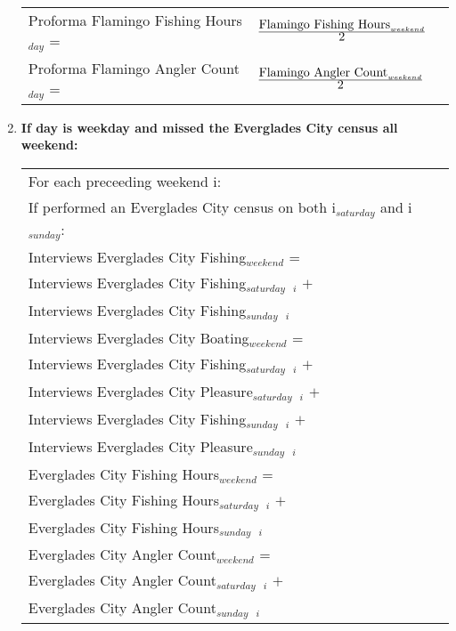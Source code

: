 \documentclass[letterpaper,12pt]{article}
\newcommand{\hspacer}{\hspace*{1cm}}
\newcommand{\fraction}[1]{\textrm{\normalsize{#1}}}
\begin{document}
\begin{enumerate}
\begin{tabular}{l@{ }l@{ }l}
	Proforma Flamingo Fishing Hours$_{day}$ =
		& $
\frac
	{\fraction{Flamingo Fishing Hours}_{weekend}}
	{\fraction{2}}
		$ \\

	Proforma Flamingo Angler Count$_{day}$ =
		& $
\frac
	{\fraction{Flamingo Angler Count}_{weekend}}
	{\fraction{2}}
		$ \\
\end{tabular}

\item
\textbf{If day is weekday and missed the Everglades City census all weekend:} \\
\begin{tabular}{l@{ }l@{ }l}
	For each preceeding weekend i: \\
\hspacer If performed an Everglades City census on both i$_{saturday}$ and i$_{sunday}$: \\
\hspacer \hspacer	Interviews Everglades City Fishing$_{weekend}$ = \\
\hspacer \hspacer \hspacer Interviews Everglades City Fishing$_{saturday}$\ $_{i}$ $+$ \\
\hspacer \hspacer \hspacer Interviews Everglades City Fishing$_{sunday}$\ $_{i}$ \\

\hspacer \hspacer	Interviews Everglades City Boating$_{weekend}$ = \\
\hspacer \hspacer \hspacer Interviews Everglades City Fishing$_{saturday}$\ $_{i}$ $+$ \\
\hspacer \hspacer \hspacer Interviews Everglades City Pleasure$_{saturday}$\ $_{i}$ $+$ \\
\hspacer \hspacer \hspacer Interviews Everglades City Fishing$_{sunday}$\ $_{i}$ $+$ \\
\hspacer \hspacer \hspacer Interviews Everglades City Pleasure$_{sunday}$\ $_{i}$ \\

\hspacer \hspacer Everglades City Fishing Hours$_{weekend}$ = \\
\hspacer \hspacer \hspacer Everglades City Fishing Hours$_{saturday}$\ $_{i}$ $+$ \\
\hspacer \hspacer \hspacer Everglades City Fishing Hours$_{sunday}$\ $_{i}$ \\

\hspacer \hspacer Everglades City Angler Count$_{weekend}$ = \\
\hspacer \hspacer \hspacer Everglades City Angler Count$_{saturday}$\ $_{i}$ $+$ \\
\hspacer \hspacer \hspacer Everglades City Angler Count$_{sunday}$\ $_{i}$ \\
\end{tabular}


\end{enumerate}
\end{document}
